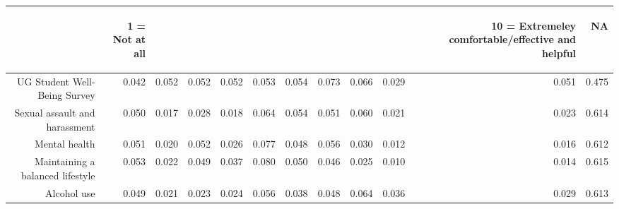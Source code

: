 \documentclass{article}\usepackage[]{graphicx}\usepackage[]{color}
\begin{document}
\begin{table}[ht]
\centering
\begin{tabular}{rrrrrrrrrrrr}
  \hline
 & \begin{sideways} 1 = Not at all \end{sideways} & \begin{sideways}   \end{sideways} & \begin{sideways}   \end{sideways} & \begin{sideways}   \end{sideways} & \begin{sideways}   \end{sideways} & \begin{sideways}   \end{sideways} & \begin{sideways}   \end{sideways} & \begin{sideways}   \end{sideways} & \begin{sideways}   \end{sideways} & \begin{sideways} 10 = Extremeley comfortable/effective and helpful \end{sideways} & \begin{sideways} NA \end{sideways} \\ 
  \hline
UG Student Well-Being Survey & 0.042 & 0.052 & 0.052 & 0.052 & 0.053 & 0.054 & 0.073 & 0.066 & 0.029 & 0.051 & 0.475 \\ 
  Sexual assault and harassment & 0.050 & 0.017 & 0.028 & 0.018 & 0.064 & 0.054 & 0.051 & 0.060 & 0.021 & 0.023 & 0.614 \\ 
  Mental health & 0.051 & 0.020 & 0.052 & 0.026 & 0.077 & 0.048 & 0.056 & 0.030 & 0.012 & 0.016 & 0.612 \\ 
  Maintaining a balanced lifestyle & 0.053 & 0.022 & 0.049 & 0.037 & 0.080 & 0.050 & 0.046 & 0.025 & 0.010 & 0.014 & 0.615 \\ 
  Alcohol use & 0.049 & 0.021 & 0.023 & 0.024 & 0.056 & 0.038 & 0.048 & 0.064 & 0.036 & 0.029 & 0.613 \\ 
   \hline
\end{tabular}
\end{table}
\end{document}

